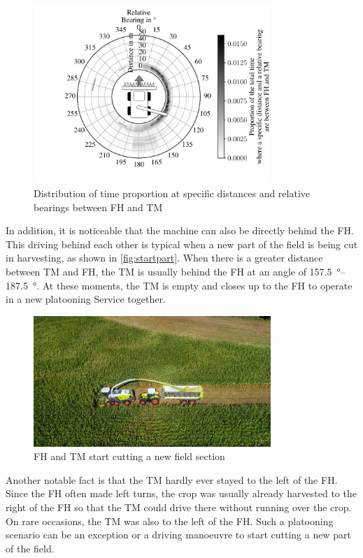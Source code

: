 \begin{figure}[H]
   \centering
   \includegraphics[width=0.8\textwidth]{figures/bearingHarvestScenario50.pdf}
   \caption{Distribution of time proportion at specific distances and relative bearings between \acf{FH} and \acf{TM}}%
   \label{fig:bearing}%
\end{figure}

In addition, it is noticeable that the machine can also be directly behind the \ac{FH}.
This driving behind each other is typical when a new part of the field is being cut in harvesting,
as shown in \autoref{fig:startpart}.
When there is a greater distance between \ac{TM} and \ac{FH}, the \ac{TM} is usually behind the FH at an angle of
\SIrange{157.5}{187.5}{\degree}.
At these moments, the \ac{TM} is empty and closes up to the \ac{FH} to operate in a new platooning Service together.

\begin{figure}[H]%
   \centering
   \includegraphics[width=0.8\textwidth]{figures/claas_harvest_behind.png}
   \caption{\acf{FH} and \acf{TM} start cutting a new field section}%
   \label{fig:startpart}%
\end{figure}

Another notable fact is that the \ac{TM} hardly ever stayed to the left of the \ac{FH}.
Since the \ac{FH} often made left turns, the crop was usually already harvested to the right of the \ac{FH} so
that the \ac{TM} could drive there without running over the crop.
On rare occasions, the \ac{TM} was also to the left of the \ac{FH}.
Such a platooning scenario can be an exception or a driving manoeuvre to start cutting a new part of the field.

